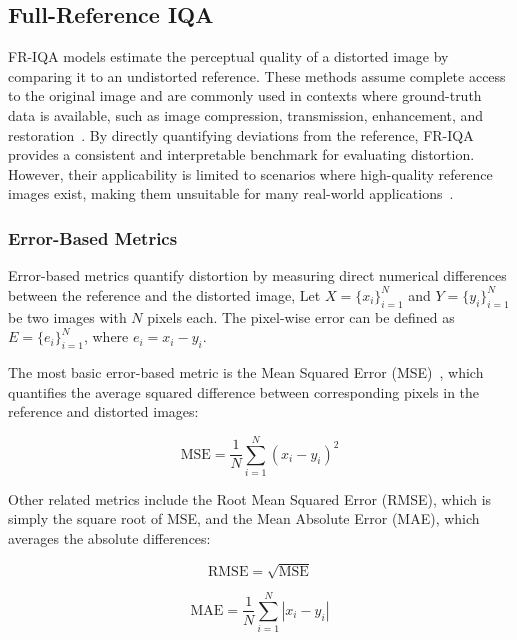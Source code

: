 \subsection{Full-Reference IQA}\label{sec:full_reference_iqa}

FR-IQA models estimate the perceptual quality of a distorted image by comparing it to an undistorted reference. These methods assume complete access to the original image and are commonly used in contexts where ground-truth data is available, such as image compression, transmission, enhancement, and restoration~\cite{sheikh2006image, wang2004image}. By directly quantifying deviations from the reference, FR-IQA provides a consistent and interpretable benchmark for evaluating distortion. However, their applicability is limited to scenarios where high-quality reference images exist, making them unsuitable for many real-world applications~\cite{mittal2012making, hosu2020koniq}.


\subsubsection{Error-Based Metrics}\label{sec:error_based_metrics}

Error-based metrics quantify distortion by measuring direct numerical differences between the reference and the distorted image, Let $X = \{x_i\}_{i=1}^N$ and $Y = \{y_i\}_{i=1}^N$ be two images with $N$ pixels each. The pixel-wise error can be defined as $E = \{e_i\}_{i=1}^N$, where $e_i = x_i - y_i$. 

The most basic error-based metric is the Mean Squared Error (MSE)~\cite{gonzalez2002digital}, which quantifies the average squared difference between corresponding pixels in the reference and distorted images:

\begin{equation}
\text{MSE} = \frac{1}{N} \sum_{i=1}^{N} (x_i - y_i)^2
\end{equation}

Other related metrics include the Root Mean Squared Error (RMSE), which is simply the square root of MSE, and the Mean Absolute Error (MAE), which averages the absolute differences:

\begin{equation}
\text{RMSE} = \sqrt{\text{MSE}}
\end{equation}

\begin{equation}
\text{MAE} = \frac{1}{N} \sum_{i=1}^{N} |x_i - y_i|
\end{equation}

